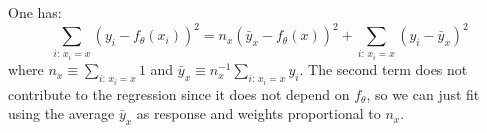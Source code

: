 

One has:
$$
\sum_{i:\, x_i = x} \left(y_i - f_\theta(x_i) \right)^2 = n_x \left(\bar{y}_x - 
f_\theta(x)\right)^2 + \sum_{i:\, x_i = x} \left(y_i - \bar{y}_x \right)^2
$$
where $n_x \equiv \sum_{i:\, x_i = x} 1$ and $\bar{y}_x \equiv n_x^{-1} \sum_{i:\, x_i = 
    x} y_i$. The second term does not contribute to the regression since it does not depend 
on $f_\theta$, so we can just fit using the average $\bar{y}_x$ as response and weights 
proportional to $n_x$.